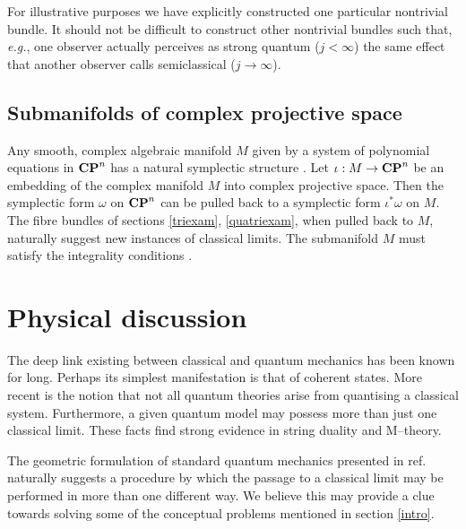 \documentclass[a4paper,a4paper]{article}
\begin{document}
For illustrative purposes we have explicitly constructed one particular nontrivial bundle. 
It should not be difficult to construct other nontrivial bundles such that, 
{\it e.g.}, one observer actually perceives as strong quantum ($j<\infty$) 
the same effect that another observer calls semiclassical ($j\to\infty$). 

\subsection{Submanifolds of complex projective space}\label{compsub}

Any smooth, complex algebraic
manifold $M$ given by a system of polynomial equations in ${\bf CP}^n$ has a 
natural symplectic structure \cite{ARNOLD}. Let $\iota :M\rightarrow {\bf 
CP}^n$ be an embedding of the complex manifold $M$ into complex projective 
space. Then the symplectic form $\omega$ on ${\bf CP}^n$ can be pulled 
back to a symplectic form $\iota ^*\omega$ on $M$. The fibre bundles of sections 
\ref{triexam}, \ref{quatriexam}, when pulled back to $M$,
naturally suggest new instances of classical limits. The submanifold $M$
must satisfy the integrality conditions \cite{WOODHOUSE}.

\section{Physical discussion}\label{discu}

The deep link existing between classical and quantum mechanics has been known 
for long. Perhaps its simplest manifestation is that of coherent states.
More recent is the notion that not all quantum theories 
arise from quantising a classical system. Furthermore, a given quantum model may 
possess more than just one classical limit. These facts find strong evidence 
in string duality and M--theory.

The geometric formulation of standard quantum mechanics  presented in ref. \cite{ASHTEKAR}
naturally suggests a procedure by which the passage to a classical limit may be 
performed in more than one different way. We believe this may provide a clue 
towards solving some of the conceptual problems mentioned in section \ref{intro}.
\end{document}
